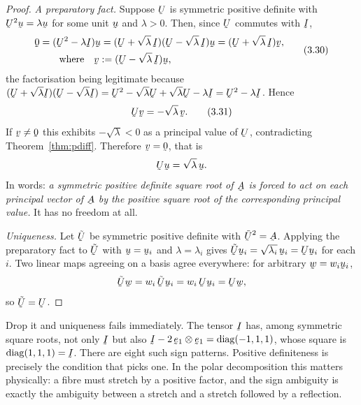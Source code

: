\begin{proof}
\emph{A preparatory fact.} Suppose $\bU$ is symmetric positive definite
with $\bU^{2}\bu=\lambda\bu$ for some unit $\bu$ and $\lambda>0$. Then,
since $\bU$ commutes with $\I$,
\begin{equation}
\begin{aligned}
   \bze&=(\bU^{2}-\lambda\I)\bu=(\bU+\sqrt{\lambda}\,\I)
        (\bU-\sqrt{\lambda}\,\I)\bu=(\bU+\sqrt{\lambda}\,\I)\bv,\\
   &\qquad\text{where}\quad \bv:=(\bU-\sqrt{\lambda}\,\I)\bu ,
\end{aligned}
   \tag{3.30}\label{eq:3.30}
\end{equation}
the factorisation being legitimate because
$(\bU+\sqrt\lambda\I)(\bU-\sqrt\lambda\I)
=\bU^{2}-\sqrt\lambda\bU+\sqrt\lambda\bU-\lambda\I=\bU^{2}-\lambda\I$.
Hence
\begin{equation}
   \bU\bv=-\sqrt{\lambda}\,\bv .
   \tag{3.31}\label{eq:3.31}
\end{equation}
If $\bv\neq\bze$ this exhibits $-\sqrt\lambda<0$ as a principal value of
$\bU$, contradicting Theorem~\ref{thm:pdiff}. Therefore $\bv=\bze$, that
is
\[
   \bU\bu=\sqrt{\lambda}\,\bu .
\]
In words: \emph{a symmetric positive definite square root of $\bA$ is
forced to act on each principal vector of $\bA$ by the positive square
root of the corresponding principal value.} It has no freedom at all.

\emph{Uniqueness.} Let $\tilde\bU$ be symmetric positive definite with
$\tilde\bU^{2}=\bA$. Applying the preparatory fact to $\tilde\bU$ with
$\bu=\bu_{i}$ and $\lambda=\lambda_{i}$ gives
$\tilde\bU\bu_{i}=\sqrt{\lambda_{i}}\,\bu_{i}=\bU\bu_{i}$ for each $i$.
Two linear maps agreeing on a basis agree everywhere: for arbitrary
$\bw=w_{i}\bu_{i}$,
\[
   \tilde\bU\bw=w_{i}\,\tilde\bU\bu_{i}=w_{i}\,\bU\bu_{i}=\bU\bw ,
\]
so $\tilde\bU=\bU$.
\end{proof}

\begin{remark}
\label{rem:whypd}
Drop it and uniqueness fails immediately. The tensor $\I$ has, among
symmetric square roots, not only $\I$ but also
$\I-2\,\be_{1}\otimes\be_{1}=\operatorname{diag}(-1,1,1)$, whose square is
$\operatorname{diag}(1,1,1)=\I$. There are eight such sign patterns.
Positive definiteness is precisely the condition that picks one. In the
polar decomposition this matters physically: a fibre must stretch by a
positive factor, and the sign ambiguity is exactly the ambiguity between a
stretch and a stretch followed by a reflection.
\end{remark}

